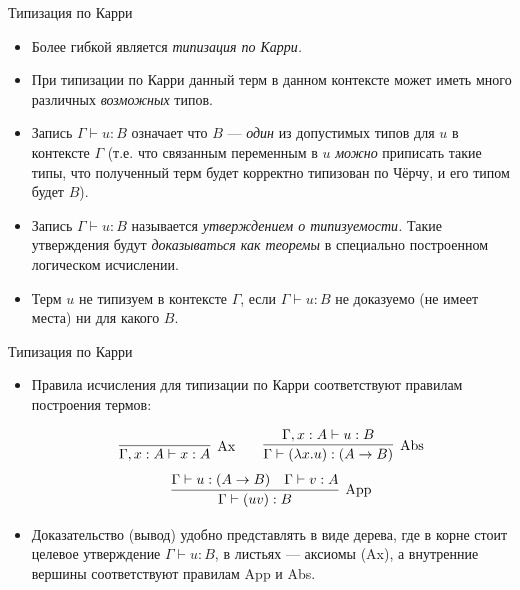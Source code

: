 \documentclass[xcolor=dvipsnames]{beamer}
\begin{document}
\begin{frame}{Типизация по Карри}

\begin{itemize}[<+->]
 \item Более гибкой является {\em типизация по Карри.}
 \item При типизации по Карри данный терм в данном контексте может иметь много различных {\em возможных} типов.
 \item Запись $\Gamma \vdash u : B$ означает что %
 $B$ --- {\em один} из допустимых типов для $u$ в контексте $\Gamma$
 (т.е. что связанным переменным в $u$ {\em можно} приписать такие типы, что полученный терм будет корректно типизован по Чёрчу, и его типом будет $B$).
 \item Запись $\Gamma \vdash u : B$ называется {\em утверждением о типизуемости.} Такие утверждения будут {\em доказываться как теоремы} в специально построенном логическом исчислении.
 \item Терм $u$ не типизуем в контексте $\Gamma$, если $\Gamma \vdash u : B$ не доказуемо (не имеет места) ни для какого $B$.
\end{itemize}

 
\end{frame}

\begin{frame}{Типизация по Карри}

\begin{itemize}[<+->]
 \item Правила исчисления для типизации по Карри соответствуют правилам построения термов:
 
 \[
  \infer[\mathrm{Ax}]
  {\Gamma, x : A \vdash x : A}{}
  \qquad
  \infer[\mathrm{Abs}]
  {\Gamma \vdash
  (\lambda x . u) : (A \to B)}
  {\Gamma, x : A \vdash u : B}
 \]
 \[
  \infer[\mathrm{App}]
  {\Gamma \vdash (uv) : B}
  {\Gamma \vdash u : 
  (A \to B) & 
  \Gamma \vdash v : A}
 \]
\item Доказательство (вывод) удобно представлять в виде дерева, где в корне стоит целевое утверждение $\Gamma \vdash u : B$, в листьях --- аксиомы (Ax), а внутренние вершины соответствуют правилам App и Abs. 
\end{itemize}

 
\end{frame}
\end{document}
